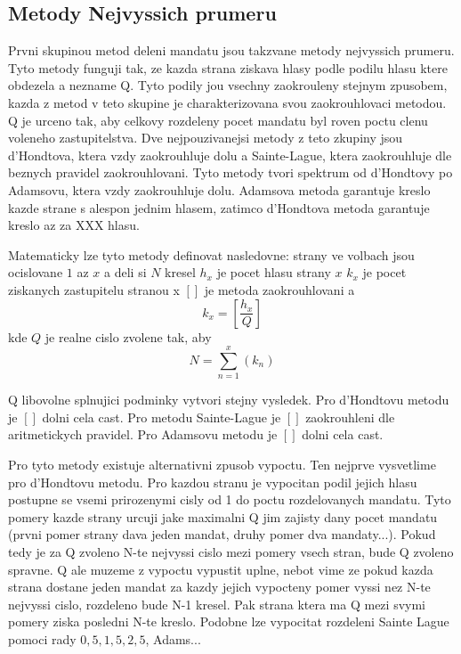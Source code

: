 \documentclass[12pt,a4paper]{article}
\begin{document}
\subsection{Metody Nejvyssich prumeru}
Prvni skupinou metod deleni mandatu jsou takzvane metody nejvyssich prumeru.
Tyto metody funguji tak, ze kazda strana ziskava hlasy podle podilu hlasu ktere obdezela a nezname Q.
Tyto podily jou vsechny zaokrouleny stejnym zpusobem, kazda z metod v teto skupine je charakterizovana svou zaokrouhlovaci metodou.
Q je urceno tak, aby celkovy rozdeleny pocet mandatu byl roven poctu clenu voleneho zastupitelstva.
Dve nejpouzivanejsi metody z teto zkupiny jsou d'Hondtova, ktera vzdy zaokrouhluje dolu a Sainte-Lague, ktera zaokrouhluje dle beznych pravidel zaokrouhlovani.
Tyto metody tvori spektrum od d'Hondtovy po Adamsovu, ktera vzdy zaokrouhluje dolu.
Adamsova metoda garantuje kreslo kazde strane s alespon jednim hlasem, zatimco d'Hondtova metoda garantuje kreslo az za XXX hlasu.

Matematicky lze tyto metody definovat nasledovne:
strany ve volbach jsou ocislovane $1$ az $x$ a deli si $N$ kresel
$h_{x}$ je pocet hlasu strany $x$
$k_{x}$ je pocet ziskanych zastupitelu stranou x
$[]$ je metoda zaokrouhlovani
a
$$k_{x}=[\dfrac{h_{x}}{Q}]$$ kde $Q$ je realne cislo zvolene tak, aby $$N=\sum_{n=1}^{x} (k_{n})$$ 

Q libovolne splnujici podminky vytvori stejny vysledek. %
Pro d'Hondtovu metodu je $[]$ dolni cela cast.
Pro metodu Sainte-Lague je $[]$ zaokrouhleni dle aritmetickych pravidel.
Pro Adamsovu metodu je $[]$ dolni cela cast.

Pro tyto metody existuje alternativni zpusob vypoctu.
Ten nejprve vysvetlime pro d'Hondtovu metodu.
Pro kazdou stranu je vypocitan podil jejich hlasu postupne se vsemi prirozenymi cisly od 1 do poctu rozdelovanych mandatu.
Tyto pomery kazde strany urcuji jake maximalni Q jim zajisty dany pocet mandatu (prvni pomer strany dava jeden mandat, druhy pomer dva mandaty...).
Pokud tedy je za Q zvoleno N-te nejvyssi cislo mezi pomery vsech stran, bude Q zvoleno spravne.
Q ale muzeme z vypoctu vypustit uplne, nebot vime ze pokud kazda strana dostane jeden mandat za kazdy jejich vypocteny pomer vyssi nez N-te nejvyssi cislo, rozdeleno bude N-1 kresel.
Pak strana ktera ma Q mezi svymi pomery ziska posledni N-te kreslo.
Podobne lze vypocitat rozdeleni Sainte Lague pomoci rady $0{,}5, 1{,}5, 2{,}5$, Adams... %

\end{document}
